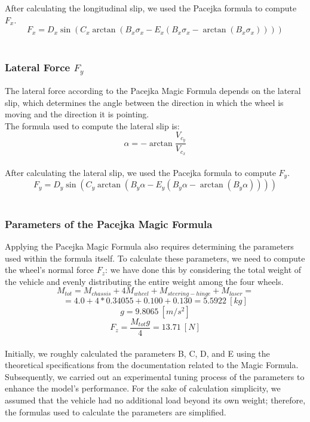After calculating the longitudinal slip, we used the Pacejka formula to compute $F_x$.
\\
\[F_x = D_x\sin(C_x\arctan(B_x\sigma_x - E_x(B_x\sigma_x - \arctan(B_x\sigma_x))))\]\\

\subsubsection{Lateral Force $F_y$}
The lateral force according to the Pacejka Magic Formula depends on the lateral slip, which determines the angle between the direction in which the wheel is moving and the direction it is pointing.
\\
The formula used to compute the lateral slip is:
\[
\alpha = - \arctan{\frac{V_{c_y}}{V_{c_x}}}
\] \\
After calculating the lateral slip, we used the Pacejka formula to compute $F_y$.
\\
\[F_y = D_y\sin(C_y\arctan(B_y\alpha - E_y(B_y\alpha - \arctan(B_y\alpha))))\]\\

\subsubsection{Parameters of the Pacejka Magic Formula}
Applying the Pacejka Magic Formula also requires determining the parameters used within the formula itself. 
To calculate these parameters, we need to compute the wheel's normal force $F_z$: we have done this by considering the total weight of the vehicle and evenly distributing the entire weight among the four wheels.
\\
\[M_{tot} = M_{chassis} + 4M_{wheel} + M_{steering-hinge} + M_{laser} = \]
 \[ = 4.0 + 4*0.34055 + 0.100 + 0.130 = 5.5922 \ [kg]\]
\[g = 9.8065 \ [m/s^2]\]
\[F_z = \frac{M_{tot}g}{4} = 13.71 \ [N]\]\\

Initially, we roughly calculated the parameters B, C, D, and E using the theoretical specifications from the documentation related to the Magic Formula. Subsequently, we carried out an experimental tuning process of the parameters to enhance the model's performance.
For the sake of calculation simplicity, we assumed that the vehicle had no additional load beyond its own weight; therefore, the formulas used to calculate the parameters are simplified.

